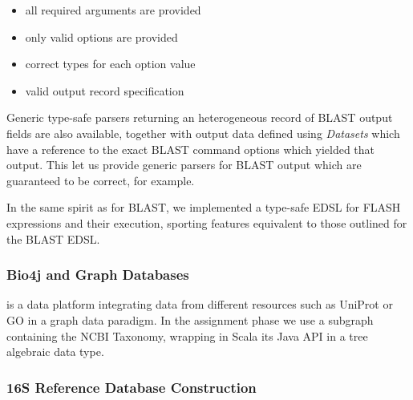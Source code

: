 \documentclass{frontiersSCNS} %
\providecommand{\tightlist}{%
\setlength{\itemsep}{0pt}\setlength{\parskip}{0pt}}
\begin{document}
\begin{itemize}
\tightlist
\item
  all required arguments are provided
\item
  only valid options are provided
\item
  correct types for each option value
\item
  valid output record specification
\end{itemize}

Generic type-safe parsers returning an heterogeneous record of BLAST
output fields are also available, together with output data defined
using \emph{Datasets} which have a reference to the exact BLAST command
options which yielded that output. This let us provide generic parsers
for BLAST output which are guaranteed to be correct, for example.

In the same spirit as for BLAST, we implemented a type-safe EDSL for
FLASH expressions and their execution, sporting features equivalent to
those outlined for the BLAST EDSL.

\subsubsection{Bio4j and Graph
Databases}\label{bio4j-and-graph-databases}

\citep[Bio4j][]{pareja2015bio4j} is a data platform integrating data
from different resources such as UniProt or GO in a graph data paradigm.
In the assignment phase we use a subgraph containing the NCBI Taxonomy,
wrapping in Scala its Java API in a tree algebraic data type.

\subsubsection{16S Reference Database
Construction}\label{s-reference-database-construction}
\end{document}
